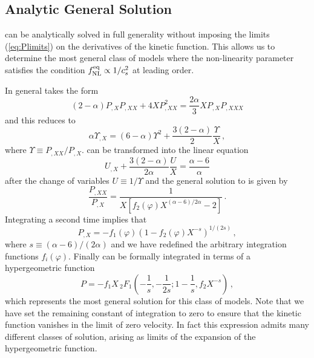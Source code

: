 \subsection{Analytic General Solution}
\label{sec:apx-multi}
 can be analytically solved in full 
generality without imposing the limits (\ref{eq:Plimits}) on the 
derivatives of the kinetic function. This allows us to determine the 
most general class of models where the non-linearity parameter 
satisfies the condition $f_{\mathrm{NL}}^{\mathrm{eq}} \propto 1/c_s^2$ at leading order. 

In general  takes the form 
% 
\begin{equation}
\label{eq:genPXeqn-multi}
(2-\alpha ) P_{,X}P_{,XX} + 4XP^2_{,XX} = \frac{2\alpha }{3}
X P_{,X}P_{,XXX}
\end{equation}
% 
and this reduces to 
% 
\begin{equation}
\label{eq:genreduce-multi}
\alpha \Upsilon_{,X} = (6-\alpha ) \Upsilon^2 + \frac{3(2-\alpha )}{2}
\frac{\Upsilon}{X} \, ,
\end{equation}
% 
where $\Upsilon \equiv P_{,XX}/P_{,X}$. 
 can be transformed into the 
linear equation
% 
\begin{equation}
\label{eq:lineargen-multi}
U_{,X}+ \frac{3(2-\alpha )}{2\alpha} \frac{U}{X} = \frac{\alpha -6}{\alpha}
\end{equation}
% 
after the change of variables $U \equiv 1/\Upsilon$
and the general solution to  is given by
%  
\begin{equation}
\label{eq:gensolnlinear-multi}
\frac{P_{,XX}}{P_{,X}} = \frac{1}{X\left[ f_2(\varphi) X^{(\alpha -6)/2\alpha}
-2 \right] } \, .
\end{equation}
% 
Integrating a second time implies that
% 
\begin{equation}
\label{eq:secondint-multi}
P_{,X} = -f_1 (\varphi ) \left( 1- f_2(\varphi ) X^{-s} \right)^{1/(2s)}  \, ,
\end{equation}
% 
where $s \equiv (\alpha -6 )/(2 \alpha)$ and we have redefined 
the arbitrary integration functions $f_i(\varphi )$.  
Finally  can be formally integrated 
in terms of a hypergeometric function
%  
\begin{equation}
 \label{eq:thirdint-multi}
 P= -f_1X \,{_2}F_1 \left( -\frac{1}{s}, -\frac{1}{2s}; 1-\frac{1}{s}, f_2X^{-s}
\right)  \, ,
\end{equation}
%  
which represents the most general solution for this class of models. 
Note that we have set the
remaining constant of integration to zero to ensure 
that the kinetic function vanishes in the limit of
zero velocity. In fact this expression admits many 
different classes of solution, arising as limits
of the expansion of the hypergeometric function.


